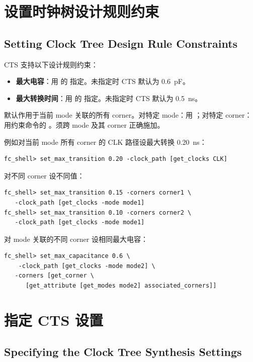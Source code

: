 \section{设置时钟树设计规则约束}
\subsection*{Setting Clock Tree Design Rule Constraints}

CTS 支持以下设计规则约束：
\begin{itemize}
  \item \textbf{最大电容}：用  的  指定。未指定时 CTS 默认为 0.6~pF。
  \item \textbf{最大转换时间}：用  的  指定。未指定时 CTS 默认为 0.5~ns。
\end{itemize}

默认作用于当前 mode 关联的所有 corner。对特定 mode：用 ；对特定 corner：用约束命令的 。须跨 mode 及其 corner 正确施加。

例如对当前 mode 所有 corner 的 CLK 路径设最大转换 0.20~ns：
\begin{lstlisting}
fc_shell> set_max_transition 0.20 -clock_path [get_clocks CLK]
\end{lstlisting}

对不同 corner 设不同值：
\begin{lstlisting}
fc_shell> set_max_transition 0.15 -corners corner1 \
   -clock_path [get_clocks -mode mode1]
fc_shell> set_max_transition 0.10 -corners corner2 \
   -clock_path [get_clocks -mode mode1]
\end{lstlisting}

对 mode 关联的不同 corner 设相同最大电容：
\begin{lstlisting}
fc_shell> set_max_capacitance 0.6 \
    -clock_path [get_clocks -mode mode2] \
   -corners [get_corner \
      [get_attribute [get_modes mode2] associated_corners]]
\end{lstlisting}

\section{指定 CTS 设置}
\subsection*{Specifying the Clock Tree Synthesis Settings}

